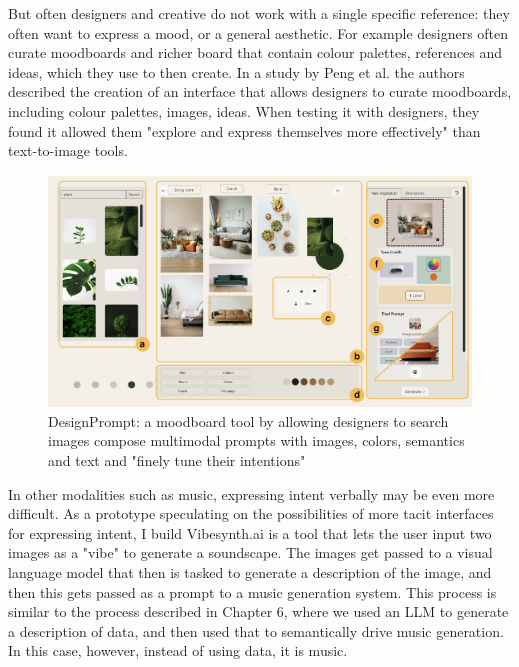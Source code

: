 But often designers and creative do not work with a single specific reference: they often want to express a mood, or a general aesthetic. For example designers often curate moodboards and richer board that contain colour palettes, references and ideas, which they use to then create. In a study by Peng et al. \cite{Peng2024-tr} the authors described the creation of an interface that allows designers to curate moodboards, including colour palettes, images, ideas. When testing it with designers, they found it allowed them "explore and express themselves more effectively" than text-to-image tools. 

\begin{figure}
    \centering
    \includegraphics[width=1\linewidth]{designprompt.png}
    \caption{DesignPrompt: a moodboard tool by \cite{Peng2024-tr} allowing designers to search images compose multimodal prompts with images, colors, semantics and text and "finely tune their intentions"}
    \label{fig:enter-label}
\end{figure}

In other modalities such as music, expressing intent verbally may be even more difficult. As a prototype speculating on the possibilities of more tacit interfaces for expressing intent, I build Vibesynth.ai is a tool that lets the user input two images as a "vibe" to generate a soundscape. The images get passed to a visual language model that then is tasked to generate a description of the image, and then this gets passed as a prompt to a music generation system. This process is similar to the process described in Chapter 6, where we used an LLM to generate a description of data, and then used that to semantically drive music generation. In this case, however, instead of using data, it is music. 

